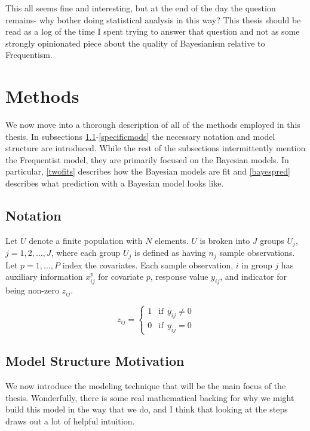 \documentclass[12pt,twoside]{reedthesis}
\begin{document}
This all seems fine and interesting, but at the end of the day the question remains- why bother doing statistical analysis in this way? This thesis should be read as a log of the time I spent trying to answer that question and not as some strongly opinionated piece about the quality of Bayesianism relative to Frequentism.

\hypertarget{methods-sec}{%
\chapter{Methods}\label{methods-sec}}

We now move into a thorough description of all of the methods employed in this thesis. In subsections \ref{notation}-\ref{specificmods} the necessary notation and model structure are introduced. While the rest of the subsections intermittently mention the Frequentist model, they are primarily focused on the Bayesian models. In particular, \ref{twofits} describes how the Bayesian models are fit and \ref{bayespred} describes what prediction with a Bayesian model looks like.

\hypertarget{notation}{%
\section{Notation}\label{notation}}

Let \(U\) denote a finite population with \(N\) elements. \(U\) is broken into \(J\) groups \(U_j\), \(j = 1, 2, ..., J\), where each group \(U_j\) is defined as having \(n_j\) sample observations. Let \(p = 1, ..., P\) index the covariates. Each sample observation, \(i\) in group \(j\) has auxiliary information \(x_{ij}^p\) for covariate \(p\), response value \(y_{ij}\), and indicator for being non-zero \(z_{ij}\).

\[
z_{ij} =
\begin{cases}
1 & \text{if}\ \ y_{ij} \ne 0 \\
0 & \text{if} \ \ y_{ij} = 0
\end{cases}
\]

\hypertarget{model-structure-motivation}{%
\section{Model Structure Motivation}\label{model-structure-motivation}}

We now introduce the modeling technique that will be the main focus of the thesis. Wonderfully, there is some real mathematical backing for why we might build this model in the way that we do, and I think that looking at the steps draws out a lot of helpful intuition.
\end{document}

